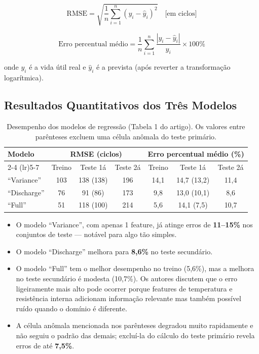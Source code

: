 \documentclass[12pt,a4paper]{article}
\begin{document}
\begin{equation}
  \text{RMSE} = \sqrt{\frac{1}{n}\sum_{i=1}^{n}(y_i - \hat{y}_i)^2}
  \quad \text{[em ciclos]}
\end{equation}

\begin{equation}
  \text{Erro percentual m\'{e}dio} = \frac{1}{n}\sum_{i=1}^{n}
  \frac{|y_i - \hat{y}_i|}{y_i} \times 100\%
\end{equation}

onde $y_i$ \'{e} a vida \'{u}til real e $\hat{y}_i$ \'{e} a prevista (ap\'{o}s
reverter a transforma\c{c}\~ao logar\'{i}tmica).

\subsection{Resultados Quantitativos dos Tr\^{e}s Modelos}

\begin{table}[H]
\centering
\caption{Desempenho dos modelos de regress\~ao (Tabela 1 do artigo).
  Os valores entre par\^{e}nteses excluem uma c\'{e}lula an\^{o}mala do teste prim\'{a}rio.}
\begin{tabular}{@{}lcccccc@{}}
\toprule
\multirow{2}{*}{\textbf{Modelo}} &
\multicolumn{3}{c}{\textbf{RMSE (ciclos)}} &
\multicolumn{3}{c}{\textbf{Erro percentual m\'{e}dio (\%)}} \\
\cmidrule(lr){2-4} \cmidrule(lr){5-7}
& Treino & Teste 1\'{a} & Teste 2\'{a} & Treino & Teste 1\'{a} & Teste 2\'{a} \\
\midrule
``Variance'' & 103 & 138 (138) & 196 & 14,1 & 14,7 (13,2) & 11,4 \\
``Discharge'' & 76  & 91 (86)  & 173 & 9,8  & 13,0 (10,1) & 8,6  \\
``Full''      & 51  & 118 (100) & 214 & 5,6  & 14,1 (7,5)  & 10,7 \\
\bottomrule
\end{tabular}
\end{table}

\begin{destaque}
\begin{itemize}
  \item O modelo ``Variance'', com apenas 1 feature, j\'{a} atinge erros de
    \textbf{11--15\%} nos conjuntos de teste --- not\'{a}vel para algo t\~ao simples.
  \item O modelo ``Discharge'' melhora para \textbf{8,6\%} no teste secund\'{a}rio.
  \item O modelo ``Full'' tem o melhor desempenho no treino (5,6\%), mas
    a melhora no teste secund\'{a}rio \'{e} modesta (10,7\%). Os autores discutem
    que o erro ligeiramente mais alto pode ocorrer porque features de
    temperatura e resist\^{e}ncia interna adicionam informa\c{c}\~ao relevante
    mas tamb\'{e}m poss\'{i}vel ru\'{i}do quando o dom\'{i}nio \'{e} diferente.
  \item A c\'{e}lula an\^{o}mala mencionada nos par\^{e}nteses degradou muito
    rapidamente e n\~ao seguiu o padr\~ao das demais; exclu\'{i}-la do c\'{a}lculo
    do teste prim\'{a}rio revela erros de at\'{e} \textbf{7,5\%}.
\end{itemize}
\end{destaque}
\end{document}
